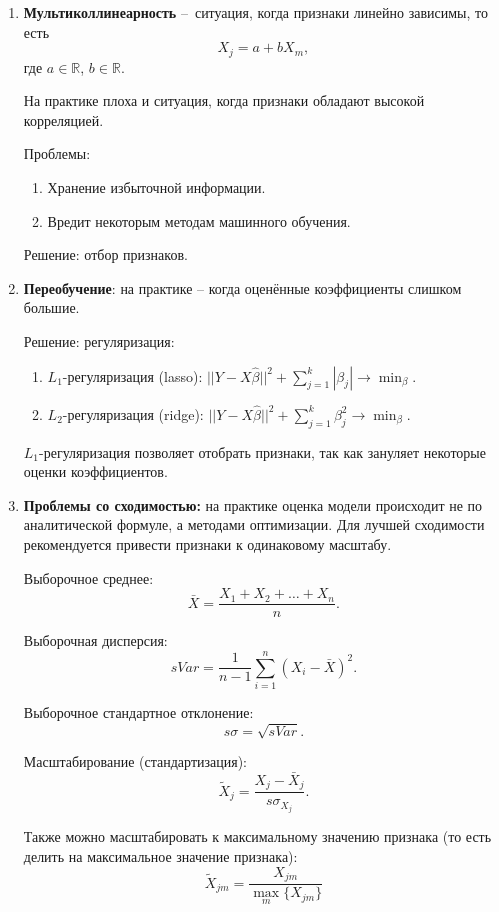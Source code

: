 \documentclass[11pt, a4paper]{extarticle}
\def \R{\mathbb{R}}
\begin{document}
\begin{enumerate}
 \item \textbf{Мультиколлинеарность} – ситуация, когда признаки линейно зависимы, то есть
\[
X_j = a + bX_m,
\]
где $a \in \R$, $b \in \R$.

На практике плоха и ситуация, когда признаки обладают высокой корреляцией.

Проблемы:
\begin{enumerate}[label = \alph*)]
	\item Хранение избыточной информации.
	\item Вредит некоторым методам машинного обучения.
\end{enumerate}

Решение: отбор признаков.

\item \textbf{Переобучение}: на практике – когда оценённые коэффициенты слишком большие. 

Решение: регуляризация:
\begin{enumerate}
	\item $L_1$-регуляризация (lasso): $||Y - X\hat{\beta}||^2 + \sum_{j = 1}^{k} |\beta_j| \rightarrow \min_{\beta}$.
	\item $L_2$-регуляризация (ridge): $||Y - X\hat{\beta}||^2 + \sum_{j = 1}^{k} \beta_j^2 \rightarrow \min_{\beta}$.
\end{enumerate}

$L_1$-регуляризация позволяет отобрать признаки, так как зануляет некоторые оценки коэффициентов. 

\item \textbf{Проблемы со сходимостью:} на практике оценка модели происходит не по аналитической формуле, а методами оптимизации. Для лучшей сходимости рекомендуется привести признаки к одинаковому масштабу. 

Выборочное среднее: 
\[
\bar{X} = \dfrac{X_1 + X_2 + \ldots + X_n}{n}.
\]

Выборочная дисперсия:
\[
sVar = \dfrac{1}{n-1} \sum_{i = 1}^{n} (X_i - \bar{X})^2.
\]

Выборочное стандартное отклонение:
\[
s\sigma = \sqrt{sVar}.
\]

Масштабирование (стандартизация): 
\[
\tilde{X}_j = \dfrac{X_j - \bar{X}_j}{s\sigma_{X_j}}.
\]

Также можно масштабировать к максимальному значению признака (то есть делить на максимальное значение признака):
\[
\tilde{X}_{jm} = \dfrac{X_{jm}}{\max_m\{X_{jm}\}}
\]

\end{enumerate}
\end{document}
